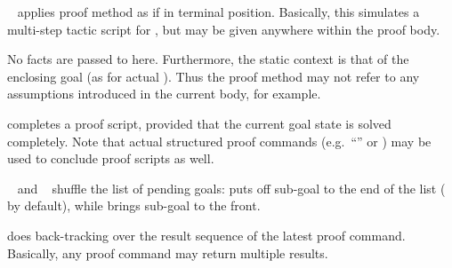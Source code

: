 \begin{isabellebody}
\begin{isamarkuptext}
\begin{description}
  \item \hyperlink{command.apply-end}{\mbox{}}~ applies proof method  as if in terminal position.  Basically, this simulates a
  multi-step tactic script for \hyperlink{command.qed}{\mbox{}}, but may be given
  anywhere within the proof body.
  
  No facts are passed to  here.  Furthermore, the static
  context is that of the enclosing goal (as for actual \hyperlink{command.qed}{\mbox{}}).  Thus the proof method may not refer to any assumptions
  introduced in the current body, for example.
  
  \item \hyperlink{command.done}{\mbox{}} completes a proof script, provided that the
  current goal state is solved completely.  Note that actual
  structured proof commands (e.g.\ ``\hyperlink{command.dot}{\mbox{}}'' or \hyperlink{command.sorry}{\mbox{}}) may be used to conclude proof scripts as well.

  \item \hyperlink{command.defer}{\mbox{}}~ and \hyperlink{command.prefer}{\mbox{}}~
  shuffle the list of pending goals: \hyperlink{command.defer}{\mbox{}} puts off
  sub-goal  to the end of the list ( by
  default), while \hyperlink{command.prefer}{\mbox{}} brings sub-goal  to the
  front.
  
  \item \hyperlink{command.back}{\mbox{}} does back-tracking over the result sequence
  of the latest proof command.  Basically, any proof command may
  return multiple results.
  
  \end{description}


\end{isamarkuptext}
\end{isabellebody}
